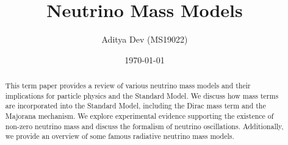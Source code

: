 \documentclass[jcp,aip,reprint,notitlepage,floatfix,superscriptaddress,twocolumn,superscriptaddress,eqsecnum]{revtex4-2}
\begin{document}
\title[PHY655 TermPaper (Spring Semester 2023)]{Neutrino Mass Models}

\author{Aditya Dev \small (MS19022) }
%



\date{\today}%

\begin{abstract}
This term paper provides a review of various neutrino mass models and their implications for particle physics and the Standard Model. We discuss how mass terms are incorporated into the Standard Model, including the Dirac mass term and the Majorana mechanism. We explore experimental evidence supporting the existence of non-zero neutrino mass and discuss the formalism of neutrino oscillations. Additionally, we provide an overview of some famous radiative neutrino mass models. 
\end{abstract}

\sffamily

\maketitle


\tableofcontents

\rmfamily
\vspace{20pt}


 
















\end{document}
